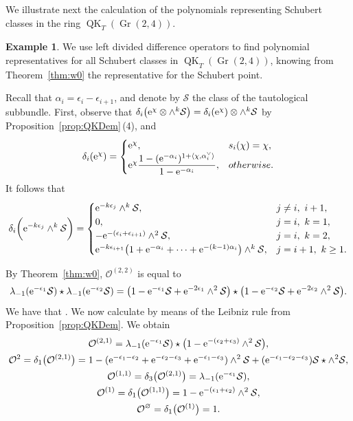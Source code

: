 \documentclass[pdftex]{sigma}
\numberwithin{equation}{section}
\theoremstyle{definition}
\newtheorem{Example}[Theorem]{Example}
\DeclareMathOperator{\Gr}{Gr}
\DeclareMathOperator{\QK}{QK}
\newcommand{\cO}{{\mathcal O}}
\newcommand{\cS}{{\mathcal S}}
\begin{document}
We illustrate next the calculation of the polynomials representing Schubert classes in the ring
$\QK_T(\Gr(2,4))$.
 \begin{Example}
We use left divided difference operators to find polynomial representatives for all Schubert classes in $\QK_T(\Gr(2,4))$, knowing from Theorem~\ref{thm:w0} the representative for the Schubert point.

Recall that $\alpha_i = \epsilon_i - \epsilon_{i+1}$, and denote by $\cS$ the class
of the tautological subbundle. First, observe that $\delta_i \bigl({\rm e}^\chi \otimes \wedge^k \cS\bigr) = \delta_i ({\rm e}^\chi) \otimes \wedge^k \cS$ by Proposition~\ref{prop:QKDem}\,(4), and
\[
\delta_i ({\rm e}^{\chi} ) =
\begin{cases} {\rm e}^{\chi}, & s_i(\chi) = \chi, \\
{\rm e}^{\chi}\dfrac{1 - ({\rm e}^{-\alpha_i})^{1+ \langle \chi, \alpha_i^\vee \rangle}}{1-{\rm e}^{-\alpha_i}}, & otherwise. \end{cases}
\]
It follows that
\[
\delta_i \biggl({\rm e}^{-k \epsilon_j} \wedge^k \cS\biggr) =
\begin{cases}
{\rm e}^{-k \epsilon_j} \wedge^k \cS, & j\neq i,\ i+1 , \\
0, & j=i,\ k=1, \\
- {\rm e}^{-(\epsilon_i+ \epsilon_{i+1})} \wedge^2 \cS, & j=i,\ k=2 , \\
{\rm e}^{-k \epsilon_{i+1}}\bigl(1+ {\rm e}^{-\alpha_i} + \dots + {\rm e}^{-(k-1)\alpha_i}\bigr) \wedge^k \cS, & j=i+1,\ k \ge 1 .
\end{cases}
\]


By Theorem~\ref{thm:w0}, $\cO^{(2,2)}$ is equal to
\[
\lambda_{-1}({\rm e}^{-\epsilon_1} \cS) \star \lambda_{-1}({\rm e}^{-\epsilon_2} \cS) = \bigl(1 - {\rm e}^{-\epsilon_1} \cS + {\rm e}^{-2\epsilon_1} \wedge^2 \cS\bigr)\star \bigl(1 - {\rm e}^{-\epsilon_2} \cS + {\rm e}^{-2\epsilon_2} \wedge^2 \cS\bigr) .
\]
We have that \smash{$\delta_2\bigl(\cO^{(2,2)}\bigr)=\cO^{(2,1)}$}. We now calculate
\smash{$\delta_2\bigl(\cO^{(2,2)}\bigr)$} by means of the Leibniz rule from Proposition~\ref{prop:QKDem}. We obtain
\begin{gather*}
\cO^{(2,1)} = \lambda_{-1}({\rm e}^{-\epsilon_1} \cS) \star \bigl(1- {\rm e}^{-(\epsilon_2+\epsilon_3)} \wedge^2 \cS\bigr) ,\\
\cO^2 =\delta_1\bigl(\cO^{(2,1)}\bigr) = 1 -({\rm e}^{-\epsilon_1-\epsilon_2}+{\rm e}^{-\epsilon_2 - \epsilon_3}+{\rm e}^{-\epsilon_1 - \epsilon_3}) \wedge^2 \cS + ({\rm e}^{-\epsilon_1 - \epsilon_2 - \epsilon_3}) \cS \star \wedge^2 \cS ,\\
\cO^{(1,1)} = \delta_3\bigl(\cO^{(2,1)}\bigr) = \lambda_{-1}({\rm e}^{-\epsilon_1} \cS) , \\
\cO^{(1)} = \delta_1\bigl(\cO^{(1,1)}\bigr) =1- {\rm e}^{-(\epsilon_1+\epsilon_2)} \wedge^2 \cS , \\
\cO^\varnothing = \delta_1 \bigl(\cO^{(1)}\bigr) = 1 .
\end{gather*}
\end{Example}
\end{document}
